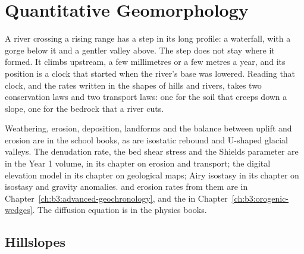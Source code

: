\chapter{Quantitative Geomorphology}\label{ch:b3:quantitative-geomorphology}

A river crossing a rising range has a step in its long profile: a waterfall,
with a gorge below it and a gentler valley above. The step does not stay
where it formed. It climbs upstream, a few millimetres or a few metres a
year, and its position is a clock that started when the river's base was
lowered. Reading that clock, and the rates written in the shapes of hills
and rivers, takes two conservation laws and two transport laws: one for the
soil that creeps down a slope, one for the bedrock that a river cuts.

\begin{recall}
Weathering, erosion, deposition, landforms and the balance between uplift
and erosion are in the school books, as are isostatic rebound and U-shaped
glacial valleys. The denudation rate, the bed shear stress and the Shields
parameter are in the Year 1 volume, in its chapter on erosion and transport;
the digital elevation model in its chapter on geological maps; Airy
isostasy in its chapter on isostasy and gravity anomalies.  and erosion rates from them are in
Chapter~\ref{ch:b3:advanced-geochronology},  and the
 in Chapter~\ref{ch:b3:orogenic-wedges}. The
diffusion equation is in the physics books.
\end{recall}

\section{Hillslopes}\label{sec:b3:quantitative-geomorphology:hillslopes}

